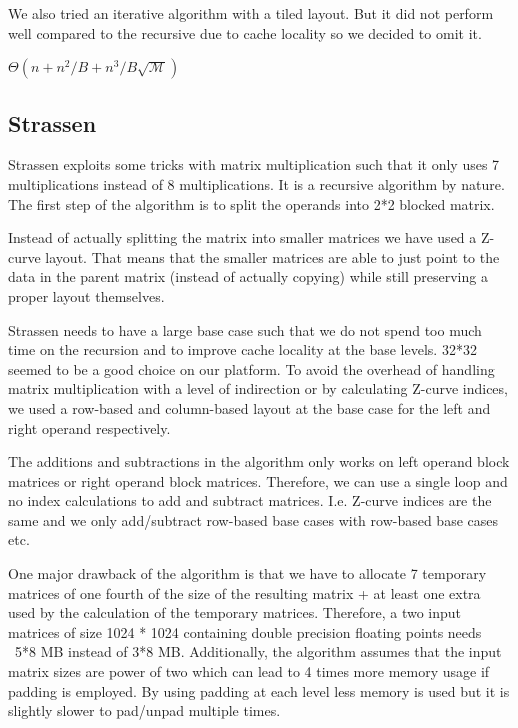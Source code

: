 We also tried an iterative algorithm with a tiled layout. But it did not perform well compared to the recursive due to cache locality so we decided to omit it.

$\Theta(n+n^2/B + n^3/B\sqrt{\mathcal{M}})$

\subsection{Strassen}

Strassen exploits some tricks with matrix multiplication such that it only uses 7 multiplications instead of 8 multiplications. It is a recursive algorithm by nature. The first step of the algorithm is to split the operands into 2*2 blocked matrix.

Instead of actually splitting the matrix into smaller matrices we have used a Z-curve layout. That means that the smaller matrices are able to just point to the data in the parent matrix (instead of actually copying) while still preserving a proper layout themselves.

Strassen needs to have a large base case such that we do not spend too much time on the recursion and to improve cache locality at the base levels. 32*32 seemed to be a good choice on our platform. To avoid the overhead of handling matrix multiplication with a level of indirection or by calculating Z-curve indices, we used a row-based and column-based layout at the base case for the left and right operand respectively.

The additions and subtractions in the algorithm only works on left operand block matrices or right operand block matrices. Therefore, we can use a single loop and no index calculations to add and subtract matrices. I.e. Z-curve indices are the same and we only add/subtract row-based base cases with row-based base cases etc.

One major drawback of the algorithm is that we have to allocate 7 temporary matrices of one fourth of the size of the resulting matrix + at least one extra used by the calculation of the temporary matrices. Therefore, a two input matrices of size 1024 * 1024 containing double precision floating points needs ~5*8 MB instead of 3*8 MB. Additionally, the algorithm assumes that the input matrix sizes are power of two which can lead to 4 times more memory usage if padding is employed. By using padding at each level less memory is used but it is slightly slower to pad/unpad multiple times.

